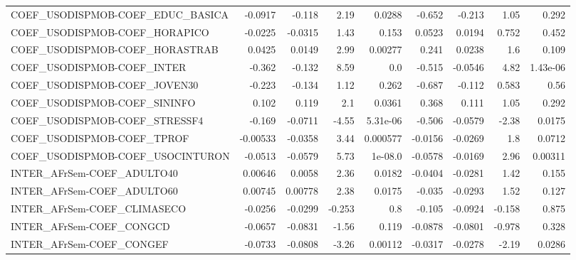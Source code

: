 \begin{tabular}{lrrrrrrrr}
COEF\_USODISPMOB-COEF\_EDUC\_BASICA      &     -0.0917 &       -0.118 &    2.19 &   0.0288 &     -0.652 &      -0.213 &         1.05 &         0.292 \\
COEF\_USODISPMOB-COEF\_HORAPICO         &     -0.0225 &      -0.0315 &    1.43 &    0.153 &     0.0523 &      0.0194 &        0.752 &         0.452 \\
COEF\_USODISPMOB-COEF\_HORASTRAB        &      0.0425 &       0.0149 &    2.99 &  0.00277 &      0.241 &      0.0238 &          1.6 &         0.109 \\
COEF\_USODISPMOB-COEF\_INTER            &      -0.362 &       -0.132 &    8.59 &      0.0 &     -0.515 &     -0.0546 &         4.82 &      1.43e-06 \\
COEF\_USODISPMOB-COEF\_JOVEN30          &      -0.223 &       -0.134 &    1.12 &    0.262 &     -0.687 &      -0.112 &        0.583 &          0.56 \\
COEF\_USODISPMOB-COEF\_SININFO          &       0.102 &        0.119 &     2.1 &   0.0361 &      0.368 &       0.111 &         1.05 &         0.292 \\
COEF\_USODISPMOB-COEF\_STRESSF4         &      -0.169 &      -0.0711 &   -4.55 & 5.31e-06 &     -0.506 &     -0.0579 &        -2.38 &        0.0175 \\
COEF\_USODISPMOB-COEF\_TPROF            &    -0.00533 &      -0.0358 &    3.44 & 0.000577 &    -0.0156 &     -0.0269 &          1.8 &        0.0712 \\
COEF\_USODISPMOB-COEF\_USOCINTURON      &     -0.0513 &      -0.0579 &    5.73 &  1e-08.0 &    -0.0578 &     -0.0169 &         2.96 &       0.00311 \\
INTER\_AFrSem-COEF\_ADULTO40            &     0.00646 &       0.0058 &    2.36 &   0.0182 &    -0.0404 &     -0.0281 &         1.42 &         0.155 \\
INTER\_AFrSem-COEF\_ADULTO60            &     0.00745 &      0.00778 &    2.38 &   0.0175 &     -0.035 &     -0.0293 &         1.52 &         0.127 \\
INTER\_AFrSem-COEF\_CLIMASECO           &     -0.0256 &      -0.0299 &  -0.253 &      0.8 &     -0.105 &     -0.0924 &       -0.158 &         0.875 \\
INTER\_AFrSem-COEF\_CONGCD              &     -0.0657 &      -0.0831 &   -1.56 &    0.119 &    -0.0878 &     -0.0801 &       -0.978 &         0.328 \\
INTER\_AFrSem-COEF\_CONGEF              &     -0.0733 &      -0.0808 &   -3.26 &  0.00112 &    -0.0317 &     -0.0278 &        -2.19 &        0.0286 \\

\end{tabular}
